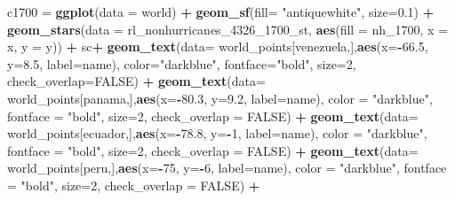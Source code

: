 \documentclass[12pt,twoside]{reedthesis}
\newenvironment{Shaded}{\begin{snugshade}}{\end{snugshade}}
\newcommand{\DataTypeTok}[1]{\textcolor[rgb]{0.13,0.29,0.53}{#1}}
\newcommand{\DecValTok}[1]{\textcolor[rgb]{0.00,0.00,0.81}{#1}}
\newcommand{\FloatTok}[1]{\textcolor[rgb]{0.00,0.00,0.81}{#1}}
\newcommand{\KeywordTok}[1]{\textcolor[rgb]{0.13,0.29,0.53}{\textbf{#1}}}
\newcommand{\NormalTok}[1]{#1}
\newcommand{\OperatorTok}[1]{\textcolor[rgb]{0.81,0.36,0.00}{\textbf{#1}}}
\newcommand{\OtherTok}[1]{\textcolor[rgb]{0.56,0.35,0.01}{#1}}
\newcommand{\StringTok}[1]{\textcolor[rgb]{0.31,0.60,0.02}{#1}}
\begin{document}
\begin{Shaded}
\begin{Highlighting}[]
\NormalTok{c1700 =}\StringTok{ }\KeywordTok{ggplot}\NormalTok{(}\DataTypeTok{data =}\NormalTok{ world) }\OperatorTok{+}\StringTok{ }
\StringTok{  }\KeywordTok{geom_sf}\NormalTok{(}\DataTypeTok{fill=} \StringTok{"antiquewhite"}\NormalTok{, }\DataTypeTok{size=}\FloatTok{0.1}\NormalTok{) }\OperatorTok{+}\StringTok{ }
\StringTok{  }\KeywordTok{geom_stars}\NormalTok{(}\DataTypeTok{data =}\NormalTok{ rl_nonhurricanes_}\DecValTok{4326}\NormalTok{_}\DecValTok{1700}\NormalTok{_st, }\KeywordTok{aes}\NormalTok{(}\DataTypeTok{fill =}\NormalTok{ nh_}\DecValTok{1700}\NormalTok{, }\DataTypeTok{x =}\NormalTok{ x, }\DataTypeTok{y =}\NormalTok{ y)) }\OperatorTok{+}\StringTok{ }
\StringTok{  }\NormalTok{sc}\OperatorTok{+}
\StringTok{  }\KeywordTok{geom_text}\NormalTok{(}\DataTypeTok{data=}\NormalTok{ world_points[venezuela,],}\KeywordTok{aes}\NormalTok{(}\DataTypeTok{x=}\OperatorTok{-}\FloatTok{66.5}\NormalTok{, }\DataTypeTok{y=}\FloatTok{8.5}\NormalTok{, }\DataTypeTok{label=}\NormalTok{name), }\DataTypeTok{color=}\StringTok{"darkblue"}\NormalTok{, }\DataTypeTok{fontface=}\StringTok{"bold"}\NormalTok{, }\DataTypeTok{size=}\DecValTok{2}\NormalTok{, }\DataTypeTok{check_overlap=}\OtherTok{FALSE}\NormalTok{) }\OperatorTok{+}
\StringTok{  }\KeywordTok{geom_text}\NormalTok{(}\DataTypeTok{data=}\NormalTok{ world_points[panama,],}\KeywordTok{aes}\NormalTok{(}\DataTypeTok{x=}\OperatorTok{-}\FloatTok{80.3}\NormalTok{, }\DataTypeTok{y=}\FloatTok{9.2}\NormalTok{, }\DataTypeTok{label=}\NormalTok{name), }\DataTypeTok{color =} \StringTok{"darkblue"}\NormalTok{, }\DataTypeTok{fontface =} \StringTok{"bold"}\NormalTok{, }\DataTypeTok{size=}\DecValTok{2}\NormalTok{, }\DataTypeTok{check_overlap =} \OtherTok{FALSE}\NormalTok{) }\OperatorTok{+}\StringTok{ }
\StringTok{  }\KeywordTok{geom_text}\NormalTok{(}\DataTypeTok{data=}\NormalTok{ world_points[ecuador,],}\KeywordTok{aes}\NormalTok{(}\DataTypeTok{x=}\OperatorTok{-}\FloatTok{78.8}\NormalTok{, }\DataTypeTok{y=}\OperatorTok{-}\DecValTok{1}\NormalTok{, }\DataTypeTok{label=}\NormalTok{name), }\DataTypeTok{color =} \StringTok{"darkblue"}\NormalTok{, }\DataTypeTok{fontface =} \StringTok{"bold"}\NormalTok{, }\DataTypeTok{size=}\DecValTok{2}\NormalTok{, }\DataTypeTok{check_overlap =} \OtherTok{FALSE}\NormalTok{) }\OperatorTok{+}
\StringTok{  }\KeywordTok{geom_text}\NormalTok{(}\DataTypeTok{data=}\NormalTok{ world_points[peru,],}\KeywordTok{aes}\NormalTok{(}\DataTypeTok{x=}\OperatorTok{-}\DecValTok{75}\NormalTok{, }\DataTypeTok{y=}\OperatorTok{-}\DecValTok{6}\NormalTok{, }\DataTypeTok{label=}\NormalTok{name), }\DataTypeTok{color =} \StringTok{"darkblue"}\NormalTok{, }\DataTypeTok{fontface =} \StringTok{"bold"}\NormalTok{, }\DataTypeTok{size=}\DecValTok{2}\NormalTok{, }\DataTypeTok{check_overlap =} \OtherTok{FALSE}\NormalTok{) }\OperatorTok{+}

\end{Highlighting}
\end{Shaded}
\end{document}

